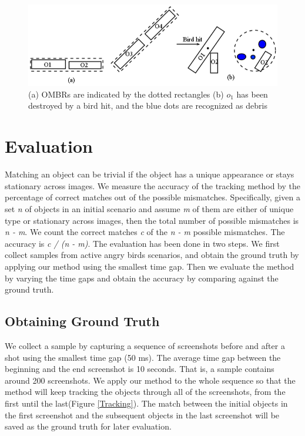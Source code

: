 \documentclass[letterpaper]{article}
\begin{document}
 
\begin{figure}[t!]
\centering\includegraphics[scale=0.3]{OMBRs.png}\caption{(a) OMBRs are indicated by the dotted rectangles (b) $o_1$ has been destroyed by a bird hit, and the blue dots are recognized as debris}  
\label{OMBRs}
\vspace{-5mm}
\end{figure}


\section{Evaluation}

Matching an object can be trivial if the object has a unique appearance or stays stationary across images. We measure the accuracy of the tracking method by the percentage of correct matches out of the possible mismatches. Specifically, given a set \emph{n} of objects in an initial scenario and assume \emph{m} of them are either of unique type or stationary across images, then the total number of possible mismatches is \emph{n - m}. We count the correct matches \emph{c} of the \emph{n - m} possible mismatches. The accuracy is  \emph{c / (n - m)}. The evaluation has been done in two steps. We first collect samples from active angry birds scenarios, and obtain the ground truth by applying our method using the smallest time gap. Then we evaluate the method by varying the time gaps and obtain the accuracy by comparing against the ground truth.

 
\subsection{Obtaining Ground Truth}

We collect a sample by capturing a sequence of screenshots before and after a shot using the smallest time gap (50 ms). The average time gap between the beginning and the end screenshot is 10 seconds. That is, a sample contains around 200 screenshots.  We apply our method to the whole sequence so that the method will keep tracking the objects through all of the screenshots, from the first until the last(Figure \ref{Tracking}). The match between the initial objects in the first screenshot and the subsequent objects in the last screenshot will be saved as the ground truth for later evaluation. %
\end{document}
